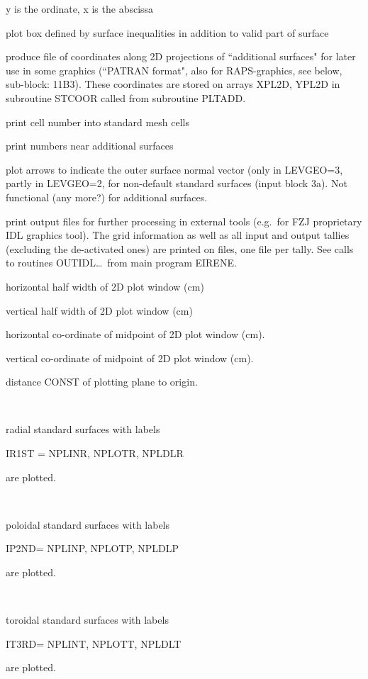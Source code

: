 \begin{description}
\begin{description}
                y is the ordinate, x is the abscissa
        \end{description}
  \item[PLBOX] plot box defined by surface inequalities in addition to valid part
        of surface
  \item[PLSTOR] produce file of coordinates along 2D projections of
        ``additional surfaces" for later use in some graphics (``PATRAN format", also
        for RAPS-graphics, see below, sub-block: 11B3).
        These coordinates are stored on arrays XPL2D, YPL2D in subroutine STCOOR called
        from subroutine PLTADD.
  \item[PLNUMV] print cell number into standard mesh cells
  \item[PLNUMS] print
        numbers near additional surfaces
  \item[PLARR] plot arrows to indicate the outer
        surface normal vector (only in LEVGEO=3, partly in LEVGEO=2, for non-default
        standard surfaces (input block 3a).
        Not functional (any more?) for additional surfaces.
  \item[PLIDL] print output files for further processing in external  tools
        (e.g.\ for FZJ proprietary IDL graphics tool).
        The grid information as well as all input and output tallies (excluding the
        de-activated ones) are printed on files, one file per tally.
        See calls to routines OUTIDL\dots\ from main program EIRENE.
  \item[CH2MX] horizontal half width of 2D plot window (\si{\centi\metre})
  \item[CH2MY] vertical half width of 2D plot window (\si{\centi\metre})
  \item[CH2X0] horizontal co-ordinate of midpoint of 2D plot window
        (\si{\centi\metre}).
  \item[CH2Y0] vertical co-ordinate of midpoint of 2D plot window
        (\si{\centi\metre}).
  \item[CH2Z0] distance CONST of plotting plane to origin.
  \item[NPLINR NPLOTR NPLDLR] ~

        radial standard surfaces with labels

        IR1ST = NPLINR, NPLOTR, NPLDLR

        are plotted.
  \item[NPLINP NPLOTP NPLDLP] ~

        poloidal standard surfaces with labels

        IP2ND= NPLINP, NPLOTP, NPLDLP

        are plotted.
  \item[NPLINT NPLOTT NPLDLT] ~

        toroidal standard surfaces with labels

        IT3RD= NPLINT, NPLOTT, NPLDLT

        are plotted.
\end{description}

